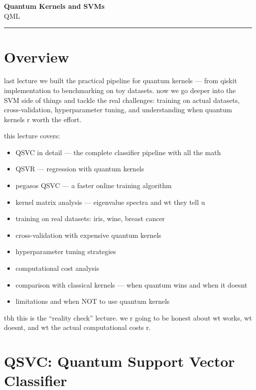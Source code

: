\documentclass[11pt,a4paper]{article}
\theoremstyle{definition}
\theoremstyle{remark}
\begin{document}
\begin{center}
    {\LARGE \textbf{Quantum Kernels and SVMs}}\\[8pt]
    {\large QML}\\[12pt]
    \hrule
\end{center}

\vspace{12pt}
\tableofcontents
\newpage

\section{Overview}

last lecture we built the practical pipeline for quantum kernels --- from qiskit implementation to benchmarking on toy datasets. now we go deeper into the SVM side of things and tackle the real challenges: training on actual datasets, cross-validation, hyperparameter tuning, and understanding when quantum kernels r worth the effort.

this lecture covers:
\begin{itemize}[leftmargin=*]
    \item QSVC in detail --- the complete classifier pipeline with all the math
    \item QSVR --- regression with quantum kernels
    \item pegasos QSVC --- a faster online training algorithm
    \item kernel matrix analysis --- eigenvalue spectra and wt they tell u
    \item training on real datasets: iris, wine, breast cancer
    \item cross-validation with expensive quantum kernels
    \item hyperparameter tuning strategies
    \item computational cost analysis
    \item comparison with classical kernels --- when quantum wins and when it doesnt
    \item limitations and when NOT to use quantum kernels
\end{itemize}

tbh this is the ``reality check'' lecture. we r going to be honest about wt works, wt doesnt, and wt the actual computational costs r.

\section{QSVC: Quantum Support Vector Classifier}
\end{document}
